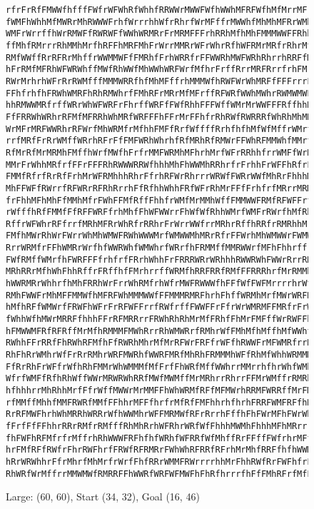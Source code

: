 \documentclass[12pt, article]{scrartcl}
\begin{document}
\begin{figure}[p]
\caption{Large: (60, 60), Start (34, 32), Goal (16, 46)}
\begin{verbatim}
rfrFrRfFMWWfhfffFWfrWFWhRfWhhfRRWWrMWWFWfhWWhMFRFWfhMfMrrMFr
fWMFhWhhMfMWRrMhRWWWFrhfWrrrhhWfrRhrfWrMFffrMWWhfMhMhMFRrWMh
WMFrWrrffhWrRMWFfRWRWFfWWhWRMRrFrMRMFFFrhRRhMfhMhFMMMWWFFRhh
ffMhfRMrrrRhMMhMrfhRFFhMRFMhFrWrrMMRrWFrWhrRfhWFRMrMRfrRhrMf
RMfWWffRrRFRrMhffrWWMMWFfFMRhfFrhWRRfrFFWWRhMWFWRhRhrrhRRFfM
hFrRMfMFRhWFWRWhffMWfRhWWfMhWWhWRFWrfMfhrFrffRrrMRFRrrfrhFMr
RWrMrhrhWFrRrRWMfffMMMWRRfhfMhMFffrhMMMWfhRWFWrWhMRFfFFFrrrF
FFhfrhfhFRWhWMRFhRhRMWhrfFMhRFrMRrMfMFrffRFWRfWWhMWhrRWMWMWF
hhRMWWMRfrffWRrWhWFWRFrFhrffWRFfFWfRhhFFFWffWMrMrWWFFFRffhhR
FfFRRWhWRhrRFMfMFRRhWhMRfWRFFFhFFrMrFFhfrRhRWfRWRRRfWhRhMhMR
WrMFrMRFWWRhrRFWrfMhWRMfrMfhhFMFfRrfWffffRrhfhfhMfWfMffrWMrf
rrfMRfFrRrWMffWRrhRFrFfFMFWRhWhrhfRfMRhRfRMWrFFWhRFMMWhfMMrf
RfMrRfMrMRMhFMffhWrfMWfhFrfrMMFWRMhMFhrhMrfWFrRRhhfrrWMFfWrR
MMrFrWhhMRfrfFFrFFFRhRWWWRRWfhhhMhFhWWMhRRhrfrFrhhFrWFFhRfrF
FMMfRfrfRrRfFrhMrWFRMhhhRhrFfrhRFWrRhrrrWRWfFWRrWWfMhRrFhhhM
MhFFWFfRWrrfRFWRrRFRhRrrhFfRfhhWhhFRfWFrRhMrFFfFrhfrfMRrrMRM
frFhhMFhMhFfMMhMfrFWhFFMfRffFhhfrWMfMrMMhWffFMMWWFRMfRFWFFrf
rWfffhRfFMMfFfRFFWRFfrhMhfFhWFWWrrFhWfWfRhhWMrfWMFrRWrfhMfRh
RffrWFWhrRFfrrfMRhMFRrWhRfrRRhrFrWrrWWfrrMRhrRffhRRfrRMRhhMr
FMfhMWrRhWrFWrrWhMhWMWFRWhWWWMrfWMWWMhMRrRfrFFWrhMhWMWWrFWMW
RrrWRMfrFFhWMRrWrfhfWWRWhfWMWhrfWRrfhFRMMffMMRWWrfMFhFhhrffr
FWfRMffWMrfhFWRFFFfrhfrfFRrhWhhFrFRRRWRrWRhhhRWWRWhFWWrRrrRR
MRhRRrMfhWhFhhRffrFRffhfFMrhrrffWRMfhRRFRRfRMfFFRRRhrfMrRMMh
hWWRMRrWhhrfhMhFRRhWrFrrWhRMfrhWfrMWFRWWWfhFFfWfFWFMrrrrhrWf
RMhFWWFrMhMFFMMWfhMFRFWhMMMWWfFFMMMRMRFhrhFhffWRMhMrfMWrWRFR
hMfhRFfWMWrfFRWFhWFrFrRFWFFrrfRWfrffFWWFFrFfrWrWMRMFFMRfrFrW
fWhhWfhMWrMRRFfhhhFFrRFMRRrrFRWhRhRhMrMfFRhfFhMrFMFffWrRWFFh
hFMWWMFRfRFRffMrMfhRMMMFMWhRrrRhWMWRrfRMhrWfFMhMfhMffhMfWWhf
RWhhFFrRRfFhRWhRFMfhFfRWRhMhrMfMrRFWrFRFfrWFfhRWWFrMFWMRfrrR
RhFhRrWMhrWfFrRrRMhrWRFMWRhfWWRFMRfMhRhFRMMMhWFfRhMfWhhWRMMM
FfRrRhFrWFfrWfhRhFMMrWhWMMMfMfFrfFhWRfMffWWhrrMMrrhfhrWhfWMh
WfrfWMFfRfhRhWffWWrMRWRWhRRfMWfMWMffMrMRhrrRhrrFFMrWMffrRMRh
hfhhhrrMhRhhMrfFfrWffMWWrMrMMFFhWhWRMfRFfMFMWrhRRMFWRRffMrFM
rfMMffMhhfMMFRWRfMMfFFhhrMFFfhrfrMfRfFMFhhrhfhrhFRRFWMFRFfhR
RrRFMWFhrhWhMRRhWRRrWfhWWMhrWFFMRMWfRFrRrrhFffhFhFWrMFhFWrWh
fFrfFfFFhhrRRrRMfrRMfffRhMhRrhWFRhrWRfWfFhhhMWMhFhhhMFhMRrrr
fhFWFhRFMfrfrMffrhRhWWWFRFhfhfWRhfWFRRfWfMhffRrFFffFWfrhrMFf
hrFMfRFfRWfrFhrRWFhrfFRWfRFRMRrFWhWhRFRRfRFrhMrMhfRRFfhfhWWM
hRrWRWhhrFfrMhrfMhMrfrWrfFhfRRrWMMFRWrrrrhhMrFhhRWfRrFWFhfrF
RhWRfWrMffrrMMWMWfRMRRFFhWWRfWRFWFMWFhFhRfhrrrfhFfFMhRFrfMfF

\end{verbatim}
\end{figure}
\end{document}

